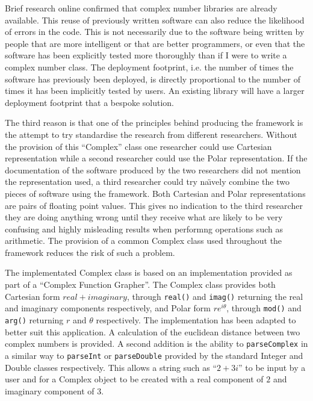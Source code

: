 Brief research online confirmed that complex number libraries are already available.
This reuse of previously written software can also reduce the likelihood of errors in the code.
This is not necessarily due to the software being written by people that are more intelligent or that are better programmers, or even that the software has been explicitly tested more thoroughly than if I were to write a complex number class.
The deployment footprint, i.e. the number of times the software has previously been deployed, is directly proportional to the number of times it has been implicitly tested by users.
An existing library will have a larger deployment footprint that a bespoke solution.

The third reason is that one of the principles behind producing the framework is the attempt to try standardise the research from different researchers.
Without the provision of this ``Complex'' class one researcher could use Cartesian representation while a second researcher could use the Polar representation.
If the documentation of the software produced by the two researchers did not mention the representation used, a third researcher could try na\"{\i}vely combine the two pieces of software using the framework.
Both Cartesian and Polar representations are pairs of floating point values.
This gives no indication to the third researcher they are doing anything wrong until they receive what are likely to be very confusing and highly misleading results when performng operations such as arithmetic.
The provision of a common Complex class used throughout the framework reduces the risk of such a problem.

The implementated Complex class is based on an implementation provided as part of a ``Complex Function Grapher''\cite{compimp}.
The Complex class provides both Cartesian form $real + imaginary$, through \lstinline{real()} and \lstinline{imag()} returning the real and imaginary components respectively, and Polar form $re^{i\theta}$, through \lstinline{mod()} and \lstinline{arg()} returning $r$ and $\theta$ respectively.
The implementation has been adapted to better suit this application.
A calculation of the euclidean distance between two complex numbers is provided.
A second addition is the ability to \lstinline{parseComplex} in a similar way to \lstinline{parseInt} or \lstinline{parseDouble} provided by the standard Integer and Double classes respectively.
This allows a string such as ``$2+3i$'' to be input by a user and for a Complex object to be created with a real component of $2$ and imaginary component of $3$.

